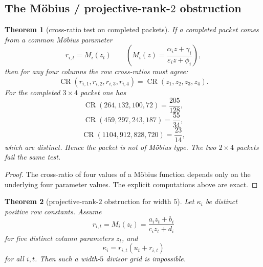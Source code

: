 \documentclass[11pt]{article}
\theoremstyle{plainbreak}
\newtheorem{theorem}{Theorem}[section]
\theoremstyle{defbreak}
\DeclareMathOperator{\CR}{CR}
\begin{document}
\subsection{The Möbius / projective-rank-$2$ obstruction}

\begin{theorem}[cross-ratio test on completed packets]
If a completed packet comes from a common Möbius parameter
\[
r_{i,t}=M_i(z_t)
\qquad
\left(
M_i(z)=\frac{\alpha_i z+\gamma_i}{\varepsilon_i z+\phi_i}
\right),
\]
then for any four columns the row cross-ratios must agree:
\[
\CR(r_{i,1},r_{i,2},r_{i,3},r_{i,4})
=
\CR(z_1,z_2,z_3,z_4).
\]
For the completed $3\times 4$ packet one has
\[
\CR(264,132,100,72)=\frac{205}{128},
\]
\[
\CR(459,297,243,187)=\frac{55}{34},
\]
\[
\CR(1104,912,828,720)=\frac{23}{14},
\]
which are distinct. Hence the packet is not of Möbius type. The two $2\times 4$ packets fail the same test.
\end{theorem}

\begin{proof}
The cross-ratio of four values of a Möbius function depends only on the underlying four parameter values. The explicit computations above are exact.
\end{proof}

\begin{theorem}[projective-rank-$2$ obstruction for width $5$]
Let $\kappa_i$ be distinct positive row constants. Assume
\[
r_{i,t}=M_i(z_t)=\frac{a_i z_t+b_i}{c_i z_t+d_i}
\]
for five distinct column parameters $z_t$, and
\[
\kappa_i=r_{i,t}(u_t+r_{i,t})
\]
for all $i,t$. Then such a width-$5$ divisor grid is impossible.
\end{theorem}
\end{document}
